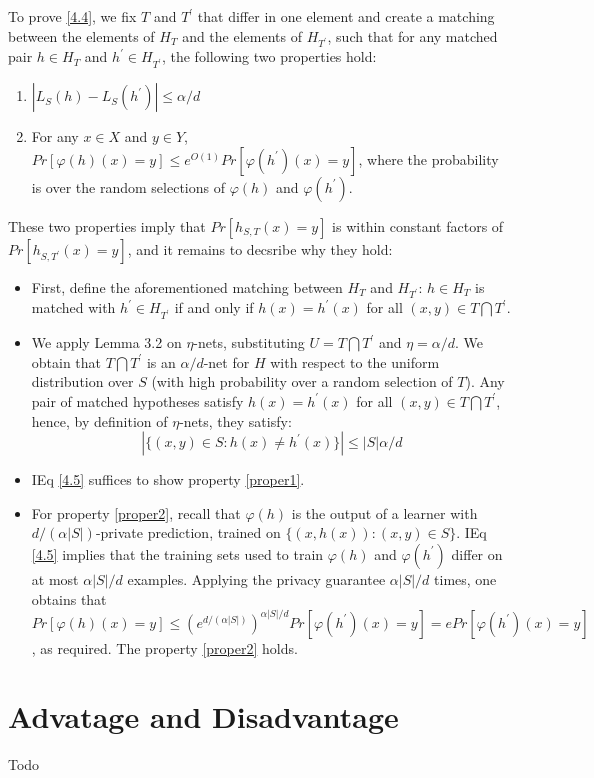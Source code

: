 \documentclass[a4paper,9pt]{scrartcl}
\begin{document}
To prove \ref{4.4}, we fix $T$ and $T^\prime$ that differ in one element and create a matching between the elements of $H_T$ and the elements of $H_{T^\prime}$, such that for any matched pair $h \in H_T$ and $h^\prime \in H_{T^\prime}$, the following two properties hold:

\begin{enumerate}
    \item $|L_S(h) - L_S(h^\prime)| \le \alpha/d$ \label {proper1}
    \item For any $x \in X$ and $y \in Y$, $Pr[\varphi(h)(x) = y] \le e^{O(1)}Pr[\varphi(h^\prime)(x) = y]$, where the probability is over the random selections of $\varphi (h)$ and $\varphi (h^\prime)$. \label {proper2}
\end{enumerate}

These two properties imply that $Pr[h_{S, T}(x) = y]$ is within constant factors of $Pr[h_{S, T^\prime}(x) = y]$, and it remains to decsribe why they hold:

\begin{itemize}
    \item First, define the aforementioned matching between $H_T$ and $H_{T^\prime}$: $h \in H_T$ is matched with $h^\prime \in H_{T^\prime}$ if and only if $h(x) = h^\prime(x)$ for all $(x, y) \in T \bigcap T^\prime$.
    \item We apply Lemma 3.2 on $\eta$-nets, substituting $U = T \bigcap T^\prime$ and $\eta = \alpha / d$. We obtain that $T \bigcap T^\prime$ is an $\alpha/d$-net for $H$ with respect to the uniform distribution over $S$ (with high probability over a random selection of $T$). Any pair of matched hypotheses satisfy $h(x) = h^\prime(x)$ for all $(x, y) \in T \bigcap T^\prime$, hence, by definition of $\eta$-nets, they satisfy:
    \begin{equation}
        |\{(x, y) \in S: h(x) \not= h^\prime(x)\}| \le |S|\alpha/d \label{4.5}
    \end{equation}
\end{itemize}

\begin{itemize}
    \item IEq \ref{4.5} suffices to show property \ref{proper1}.
    \item For property \ref{proper2}, recall that $\varphi(h)$ is the output of a learner with $d/(\alpha |S|)$-private prediction, trained on $\{(x, h(x)): (x, y) \in S\}$. IEq \ref{4.5} implies that the training sets used to train $\varphi (h)$ and $\varphi (h^\prime)$ differ on at most $\alpha |S|/d$ examples. Applying the privacy guarantee $\alpha |S|/d$ times, one obtains that $Pr[\varphi(h)(x) = y] \le (e^{d/(\alpha |S|)})^{\alpha |S| /d} Pr[\varphi(h^\prime)(x) = y] = ePr[\varphi(h^\prime)(x) = y]$, as required. The property \ref{proper2} holds.
\end{itemize}

\section{Advatage and Disadvantage}

Todo
\end{document}
